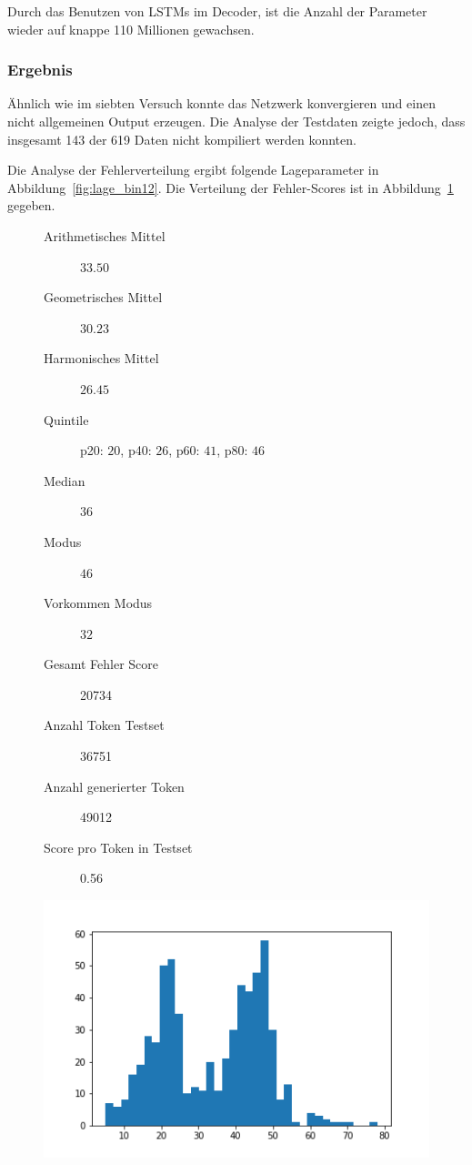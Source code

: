 \documentclass[pdftex,a4paper,halfparskip, article]{scrartcl}
\begin{document}
Durch das Benutzen von LSTMs im Decoder, ist die Anzahl der Parameter wieder auf knappe 110 Millionen gewachsen.

\subsubsection*{Ergebnis}

Ähnlich wie im siebten Versuch konnte das Netzwerk konvergieren und einen nicht allgemeinen Output erzeugen. Die Analyse der Testdaten zeigte jedoch, dass insgesamt 143 der 619 Daten nicht kompiliert werden konnten. 

Die Analyse der Fehlerverteilung ergibt folgende Lageparameter in Abbildung~\ref{fig:lage_bin12}. Die Verteilung der Fehler-Scores ist in Abbildung~\ref{fig:hist_bin12} gegeben.

\begin{figure}
\centering
\begin{minipage}{.5\textwidth}
  \centering
  \begin{description}
	\item[Arithmetisches Mittel] $33.50$	
	\item[Geometrisches Mittel] $30.23$
	\item[Harmonisches Mittel] $26.45$
	\item[Quintile] p20: $20$, p40: $26$, p60: $41$, p80: $46$
	\item[Median] $36$
	\item[Modus] $46$
	\item[Vorkommen Modus] $32$
	\item[Gesamt Fehler Score] 20734
	\item[Anzahl Token Testset] 36751 
	\item[Anzahl generierter Token] 49012
	\item[Score pro Token in Testset] 0.56
\end{description}
  \label{fig:lage_bin12}
\end{minipage}%
\begin{minipage}{.5\textwidth}
  \centering
  \includegraphics[width=1\linewidth]{predictions_bin12_histogramm}
  \label{fig:hist_bin12}
\end{minipage}
\end{figure}
\end{document}
